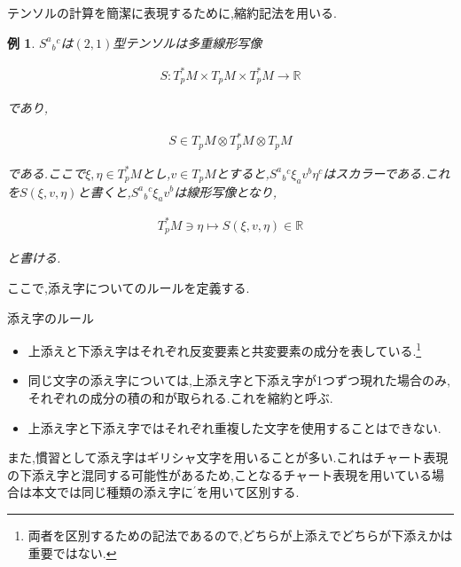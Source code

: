 \documentclass{jsarticle}
\newtheorem{exm}{例}
\begin{document}
テンソルの計算を簡潔に表現するために,縮約記法を用いる.

\begin{exm}

$S^a{}_b{}^c$は$(2,1)$型テンソルは多重線形写像

\begin{align}
S:T_p^*M \times T_pM \times T_p^*M \to \mathbb{R}
\end{align}

であり,

\begin{align}
S\in T_pM\otimes T_p^*M \otimes T_pM
\end{align}

である.ここで$\xi,\eta\in T_p^*M$とし,$v\in T_pM$とすると,$S^a{}_b{}^c\xi_av^b\eta^c$はスカラーである.これを$S(\xi,v,\eta)$と書くと,$S^a{}_b{}^c\xi_av^b$は線形写像となり,

\begin{align}
T_p^*M \ni \eta \mapsto S(\xi,v,\eta) \in \mathbb{R}
\end{align}

と書ける.

\end{exm}

ここで,添え字についてのルールを定義する.

\begin{itembox}[l]{添え字のルール}

\begin{itemize}
\item 上添えと下添え字はそれぞれ反変要素と共変要素の成分を表している.\footnote{両者を区別するための記法であるので,どちらが上添えでどちらが下添えかは重要ではない.}
\item 同じ文字の添え字については,上添え字と下添え字が1つずつ現れた場合のみ,それぞれの成分の積の和が取られる.これを縮約と呼ぶ.
\item 上添え字と下添え字ではそれぞれ重複した文字を使用することはできない.
\end{itemize}

\end{itembox}

また,慣習として添え字はギリシャ文字を用いることが多い.これはチャート表現の下添え字と混同する可能性があるため,ことなるチャート表現を用いている場合は本文では同じ種類の添え字に${}^\prime$を用いて区別する.
\end{document}
